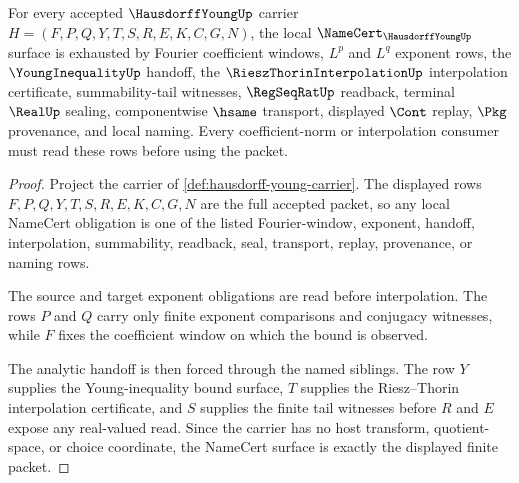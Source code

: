 \begin{theorem}
\label{thm:hausdorff-young-namecert-obligations}
For every accepted $\HausdorffYoungUp$ carrier $H=(F,P,Q,Y,T,S,R,E,K,C,G,N)$, the local $\NameCert_{\HausdorffYoungUp}$ surface is exhausted by Fourier coefficient windows, $L^p$ and $L^q$ exponent rows, the $\YoungInequalityUp$ handoff, the $\RieszThorinInterpolationUp$ interpolation certificate, summability-tail witnesses, $\RegSeqRatUp$ readback, terminal $\RealUp$ sealing, componentwise $\hsame$ transport, displayed $\Cont$ replay, $\Pkg$ provenance, and local naming. Every coefficient-norm or interpolation consumer must read these rows before using the packet.
\end{theorem}
\begin{proof}
Project the carrier of \autoref{def:hausdorff-young-carrier}. The displayed rows $F,P,Q,Y,T,S,R,E,K,C,G,N$ are the full accepted packet, so any local NameCert obligation is one of the listed Fourier-window, exponent, handoff, interpolation, summability, readback, seal, transport, replay, provenance, or naming rows.

The source and target exponent obligations are read before interpolation. The rows $P$ and $Q$ carry only finite exponent comparisons and conjugacy witnesses, while $F$ fixes the coefficient window on which the bound is observed.

The analytic handoff is then forced through the named siblings. The row $Y$ supplies the Young-inequality bound surface, $T$ supplies the Riesz--Thorin interpolation certificate, and $S$ supplies the finite tail witnesses before $R$ and $E$ expose any real-valued read. Since the carrier has no host transform, quotient-space, or choice coordinate, the NameCert surface is exactly the displayed finite packet.
\end{proof}

